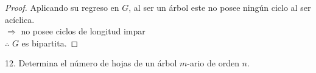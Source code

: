 \documentclass{article}
\begin{document}
  \begin{proof}
   Aplicando su regreso en $G$, al ser un árbol este no posee ningún ciclo al ser acíclica. \\
   $ \Longrightarrow $ no posee ciclos de longitud impar\\
   $\therefore$ $G$ es bipartita.
 \end{proof}
 
 12. Determina el número de hojas de un árbol $m$-ario de orden $n$. \\
 
\end{document}
